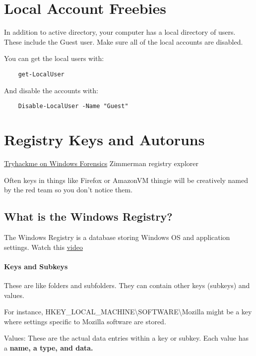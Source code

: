 \documentclass{article}
\begin{document}
\section{Local Account Freebies}
In addition to active directory, your computer has a local directory of users. These include the Guest user.
Make sure all of the local accounts are disabled.

You can get the local users with:
\begin{lstlisting}
    get-LocalUser
\end{lstlisting}
And disable the accounts with: 
\begin{lstlisting}
    Disable-LocalUser -Name "Guest"
\end{lstlisting}

\section{Registry Keys and Autoruns}
\href{https://tryhackme.com/room/windowsforensics1}{Tryhackme on Windows Forensics}
Zimmerman registry explorer

Often keys in things like Firefox or AmazonVM thingie will be creatively named by the red team
so you don't notice them.

\subsection{What is the Windows Registry?}
The Windows Registry is a database storing Windows OS and application settings. 
Watch this \href{https://youtu.be/_U78iAem3uo}{video}

\paragraph{Keys and Subkeys}
These are like folders and subfolders. They can contain other keys (subkeys) and values.

\noindent For instance, HKEY\_LOCAL\_MACHINE\textbackslash SOFTWARE\textbackslash Mozilla might be a key where settings specific to Mozilla software are stored.

\noindent Values:
These are the actual data entries within a key or subkey.
Each value has a \textbf{name, a type, and data.}
\end{document}
